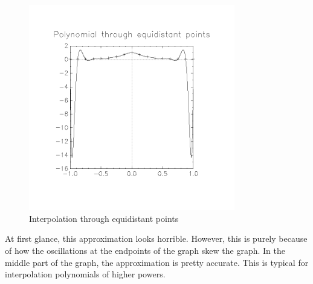 \documentclass[11pt, a4paper, titlepage, openright]{article}
\begin{document}
    \begin{figure}[H]
        \centering
        \includegraphics[width=9cm, trim={2cm, 4cm, 2cm, 3cm}, clip]{../images/poly1}
        \caption{Interpolation through equidistant points}
        \label{fig:poly1}
    \end{figure}
    At first glance, this approximation looks horrible. However, this is purely because of how the oscillations at the endpoints
    of the graph skew the graph. In the middle part of the graph, the approximation is pretty accurate.
    This is typical for interpolation polynomials of higher powers.
\end{document}
